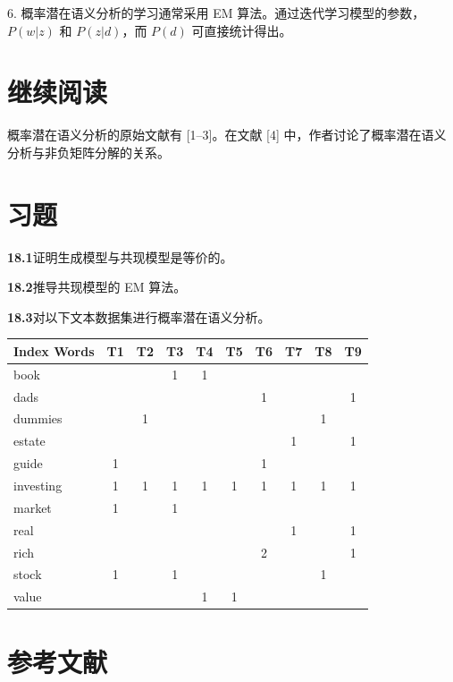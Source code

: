 \documentclass[UTF8,12pt,a4paper,fontset=fandol]{ctexart}
\begin{document}
6. 概率潜在语义分析的学习通常采用 EM 算法。通过迭代学习模型的参数，$P(w|z)$ 和 $P(z|d)$，而 $P(d)$ 可直接统计得出。

\section*{继续阅读}

概率潜在语义分析的原始文献有 [1--3]。在文献 [4] 中，作者讨论了概率潜在语义分析与非负矩阵分解的关系。

\section*{习题}

\noindent\textbf{18.1}\quad 证明生成模型与共现模型是等价的。

\noindent\textbf{18.2}\quad 推导共现模型的 EM 算法。

\noindent\textbf{18.3}\quad 对以下文本数据集进行概率潜在语义分析。

\begin{center}
\small
\begin{tabular}{lccccccccc}
\hline
Index Words & T1 & T2 & T3 & T4 & T5 & T6 & T7 & T8 & T9\\
\hline
book      &   &   & 1 & 1 &   &   &   &   &  \\
dads      &   &   &   &   &   & 1 &   &   & 1\\
dummies   &   & 1 &   &   &   &   &   & 1 &  \\
estate    &   &   &   &   &   &   & 1 &   & 1\\
guide     & 1 &   &   &   &   & 1 &   &   &  \\
investing & 1 & 1 & 1 & 1 & 1 & 1 & 1 & 1 & 1\\
market    & 1 &   & 1 &   &   &   &   &   &  \\
real      &   &   &   &   &   &   & 1 &   & 1\\
rich      &   &   &   &   &   & 2 &   &   & 1\\
stock     & 1 &   & 1 &   &   &   &   & 1 &  \\
value     &   &   &   & 1 & 1 &   &   &   &  \\
\hline
\end{tabular}
\end{center}

\section*{参考文献}
\end{document}
